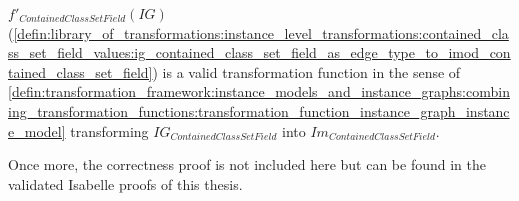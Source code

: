 \begin{thm}
\label{defin:library_of_transformations:instance_level_transformations:contained_class_set_field_values:ig_contained_class_set_field_as_edge_type_to_tmod_class_func}
$f'_{ContainedClassSetField}(IG)$ (\cref{defin:library_of_transformations:instance_level_transformations:contained_class_set_field_values:ig_contained_class_set_field_as_edge_type_to_imod_contained_class_set_field}) is a valid transformation function in the sense of \cref{defin:transformation_framework:instance_models_and_instance_graphs:combining_transformation_functions:transformation_function_instance_graph_instance_model} transforming $IG_{ContainedClassSetField}$ into $Im_{ContainedClassSetField}$.
\end{thm}

Once more, the correctness proof is not included here but can be found in the validated Isabelle proofs of this thesis.